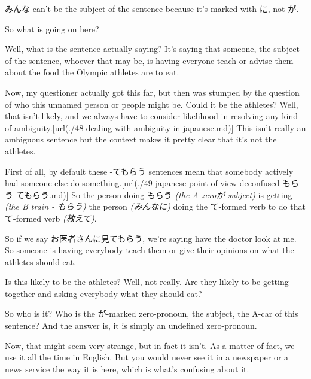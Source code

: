 みんな can't be the subject of the sentence because it's marked with に, not が.

{}

So what is going on here?

\stopsectionlevel

\startsectionlevel[title={Hidden subject sentence action},reference={hidden-subject-sentence-action}]

{}

Well, what is the sentence actually saying? It's saying that someone, the subject of the sentence, whoever that may be, is having everyone teach or advise them about the food the Olympic athletes are to eat.

Now, my questioner actually got this far, but then was stumped by the question of who this unnamed person or people might be. Could it be the athletes? Well, that isn't likely, and we always have to consider likelihood in resolving any kind of ambiguity.\goto{{[}48{]}}[url(./48-dealing-with-ambiguity-in-japanese.md)] This isn't really an ambiguous sentence but the context makes it pretty clear that it's not the athletes.

First of all, by default these -てもらう sentences mean that somebody actively had someone else do something.\goto{{[}49{]}}[url(./49-japanese-point-of-view-deconfused-もらう-てもらう.md)] So the person doing もらう {\em (the A zeroが subject)} is getting {\em (the B train - もらう)} the person {\em (みんなに)} doing the て-formed verb to do that て-formed verb {\em (教えて)}.

{}

So if we say お医者さんに見てもらう, we're saying have the doctor look at me. So someone is having everybody teach them or give their opinions on what the athletes should eat.

Is this likely to be the athletes? Well, not really. Are they likely to be getting together and asking everybody what they should eat?

\startsectionlevel[title={Who is the subject here?},reference={who-is-the-subject-here}]

So who is it? Who is the が-marked zero-pronoun, the subject, the A-car of this sentence? And the answer is, it is simply an undefined zero-pronoun.

Now, that might seem very strange, but in fact it isn't. As a matter of fact, we use it all the time in English. But you would never see it in a newspaper or a news service the way it is here, which is what's confusing about it.

